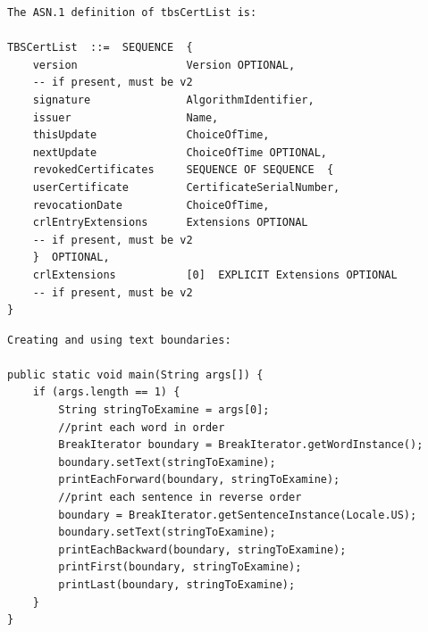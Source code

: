 \begin{lstlisting}[label=invalid-caveat-2,caption={An example of a caveat sentence extracted from the \lstinline{java.security.cert.X509CRL} documentation explaining the structure of a \lstinline{TBSCertList} object.},float,frame=tb,numbers=none,language=None,linebackgroundcolor={\lstcolorlines{3,4,5,6,7,8,9,10,11,12,13,14,15,16,17}}]
The ASN.1 definition of tbsCertList is:

TBSCertList  ::=  SEQUENCE  {
	version                 Version OPTIONAL,
	-- if present, must be v2
	signature               AlgorithmIdentifier,
	issuer                  Name,
	thisUpdate              ChoiceOfTime,
	nextUpdate              ChoiceOfTime OPTIONAL,
	revokedCertificates     SEQUENCE OF SEQUENCE  {
	userCertificate         CertificateSerialNumber,
	revocationDate          ChoiceOfTime,
	crlEntryExtensions      Extensions OPTIONAL
	-- if present, must be v2
	}  OPTIONAL,
	crlExtensions           [0]  EXPLICIT Extensions OPTIONAL
	-- if present, must be v2
}
\end{lstlisting}

\clearpage

\begin{lstlisting}[label=invalid-caveat-3,caption={An example of a caveat sentence extracted from the \lstinline{java.text.BreakIterator} documentation that contains some sample code.},float,frame=tb,numbers=none,language=None,linebackgroundcolor={\lstcolorlines{3,4,5,6,7,8,9,10,11,12,13,14,15,16,17}}]
Creating and using text boundaries:

public static void main(String args[]) {
	if (args.length == 1) {
		String stringToExamine = args[0];
		//print each word in order
		BreakIterator boundary = BreakIterator.getWordInstance();
		boundary.setText(stringToExamine);
		printEachForward(boundary, stringToExamine);
		//print each sentence in reverse order
		boundary = BreakIterator.getSentenceInstance(Locale.US);
		boundary.setText(stringToExamine);
		printEachBackward(boundary, stringToExamine);
		printFirst(boundary, stringToExamine);
		printLast(boundary, stringToExamine);
	}
}
\end{lstlisting}

